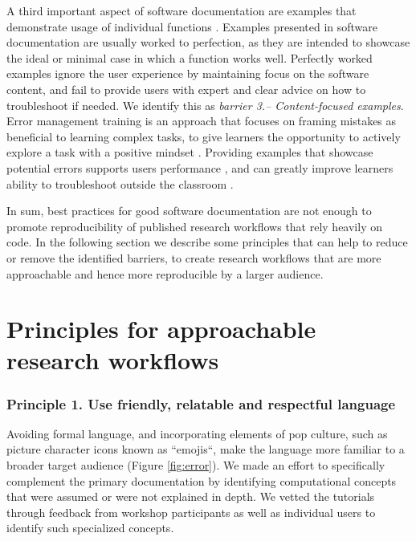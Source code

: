\documentclass[12pt]{article}
\begin{document}
A third important aspect of software documentation are examples that demonstrate usage of individual functions \citep{karimzadeh2018top}.
Examples presented in software documentation are usually worked to perfection, as they are intended to showcase the ideal or minimal case in which a function works well.
Perfectly worked examples ignore the user experience by maintaining focus on the software content, and fail to provide users with expert and clear advice on how to troubleshoot if needed.
We identify this as \textit{barrier 3.-- Content-focused examples}.
Error management training is an approach that focuses on framing mistakes as beneficial to learning complex tasks, to give learners the opportunity to
actively explore a task with a positive mindset \citep{frese1995error}.
Providing examples that showcase potential errors supports users performance \citep{steele2014error}, and can greatly improve learners ability to troubleshoot outside the classroom \citep{shannon2015live, nederbragt2020ten}.


In sum, best practices for good software documentation are not enough to promote reproducibility of published research workflows that rely heavily on code. 
In the following section we describe some principles that can help to reduce or remove the identified barriers, to create research workflows that are more approachable and hence more reproducible by a larger audience.

\section*{Principles for approachable research workflows}
\label{sec:addressing}

\subsubsection*{Principle 1. Use friendly, relatable and respectful language}


Avoiding formal language, and incorporating elements of pop culture, such as picture character icons known as ``emojis``, make the language more familiar to a broader target audience (Figure \ref{fig:error}). We made an effort to specifically complement the primary documentation by identifying computational concepts that were assumed or were not explained in depth.
We vetted the tutorials through feedback from workshop participants as well as individual users to identify such specialized concepts.
\end{document}
